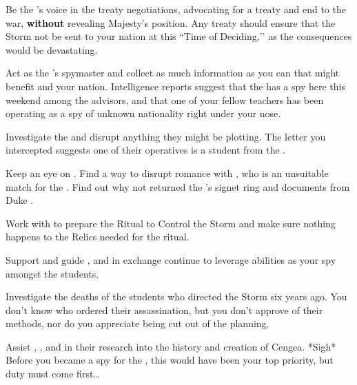 \documentclass[char]{GL2020}
\begin{document}
\begin{itemz}
    \item Be the \cQueen{\Monarch}'s voice in the treaty negotiations, advocating for a treaty and end to the war, \textbf{without} revealing \cQueen{\Their} Majesty's position. Any treaty should ensure that the Storm not be sent to your nation at this ``Time of Deciding,’’ as the consequences would be devastating.
    \item Act as the \cQueen{\Monarch}'s spymaster and collect as much information as you can that might benefit \cQueen{\them} and your nation. Intelligence reports suggest that the \pTech{} has a spy here this weekend among the advisors, and that one of your fellow teachers has been operating as a spy of unknown nationality right under your nose.
    \item Investigate the \pGoaties{} and disrupt anything they might be plotting. The letter you intercepted suggests one of their operatives is a student from the \pFarm{}.
    \item Keep an eye on \cPrince{}. Find a way to disrupt \cPrince{\their} romance with \cPirate{}, who is an unsuitable match for the \cPrince{\heir}. Find out why \cPrince{\they} \cPrince{\have} not returned the \cQueen{\Monarch}'s signet ring and documents from Duke \cChupStudent{\formal}.
    \item Work with \cLibrarian{} to prepare the Ritual to Control the Storm and make sure nothing happens to the Relics needed for the ritual.
    \item Support and guide \cLibAssist{}, and in exchange continue to leverage \cLibAssist{\their} abilities as your spy amongst the students.
    \item Investigate the deaths of the students who directed the Storm six years ago. You don't know who ordered their assassination, but you don't approve of their methods, nor do you appreciate being cut out of the planning.
    \item Assist \cEbbPriest{}, \cHeadScientist{}, and \cScholarship{} in their research into the history and creation of Cengea. *Sigh* Before you became a spy for the \cQueen{\Monarch}, this would have been your top priority, but duty must come first…
\end{itemz}
\end{document}
